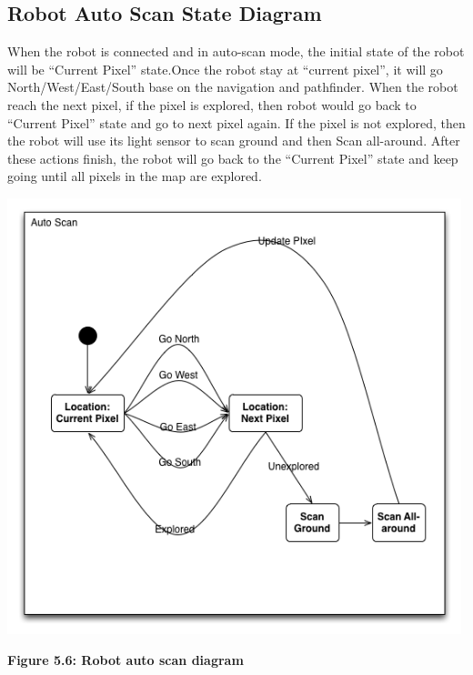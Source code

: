 \documentclass[11pt, a4paper]{report}
\begin{document}
\subsection{ Robot Auto Scan State Diagram}
When the robot is connected and in auto-scan mode, the initial state of the robot will be ``Current Pixel'' state.Once the robot stay at ``current pixel'', it will go North/West/East/South base on the navigation and pathfinder. When the robot reach the next pixel, if the pixel is explored, then robot would go back to ``Current Pixel'' state and go to next pixel again. If the pixel is not explored, then the robot will use its light sensor to scan ground and then Scan all-around. After these actions finish, the robot will go back to the ``Current Pixel'' state and keep going until all pixels in the map are explored.
 \begin{center}
 \includegraphics[width=13.20cm]{AutoScan.png}
\end{center}
\begin{center}
\textbf {Figure 5.6:  Robot auto scan diagram} \\[0.3cm]
\end{center}
\pagebreak
\end{document}
